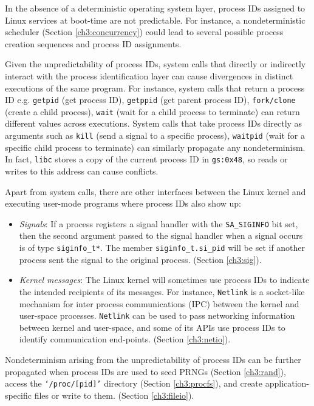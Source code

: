 In the absence of a deterministic operating system layer, process IDs assigned
to Linux services at boot-time are not predictable.
For instance, a nondeterministic scheduler (Section \ref{ch3:concurrency}) 
could lead to several possible process creation sequences
and process ID assignments.

Given the unpredictability of process IDs,
system calls that directly or indirectly
interact with the process identification layer can cause divergences
in distinct executions of the same program.
For instance, system calls that return a process ID e.g.
\texttt{getpid} (get process ID), \texttt{getppid} (get
parent process ID), \texttt{fork/clone} (create a child process),
\texttt{wait} (wait for a child process to terminate)
can return different values across executions. System calls that take process IDs 
directly as arguments such as \texttt{kill} (send a signal to a specific
process), \texttt{waitpid} (wait for a specific child process to terminate)
can similarly propagate any nondeterminism.
In fact, \texttt{libc} stores a copy of the current process ID in \texttt{gs:0x48},
so reads or writes to this address can cause conflicts.

Apart from system calls, there are other interfaces
between the Linux kernel and executing user-mode programs
where process IDs also show up:

\begin{itemize} 

\item {\em Signals}: If a process registers a signal handler with the \texttt{SA\_SIGINFO}
bit set, then the second argument passed
to the signal handler when a signal occurs is of type \texttt{siginfo\_t*}.
The member \texttt{siginfo\_t.si\_pid} will
be set if another process sent the signal 
to the original process. (Section \ref{ch3:sig}). 

\item {\em Kernel messages}: The Linux kernel will sometimes use process IDs 
to indicate the intended recipients of its messages. 
For instance, \texttt{Netlink} is a socket-like
mechanism for inter process communications (IPC)
between the kernel and user-space processes.
\texttt{Netlink} can be used to pass
networking information between kernel
and user-space, and some of its APIs 
use process IDs to identify communication
end-points. (Section \ref{ch3:netio}). \end{itemize}

\newpage 
Nondeterminism arising from the unpredictability of process IDs can be
further propagated when process IDs are used to seed PRNGs (Section \ref{ch3:rand}),
access the \texttt{`/proc/[pid]'} directory (Section \ref{ch3:procfs}),
and create application-specific files or write to them. (Section \ref{ch3:fileio}). 

